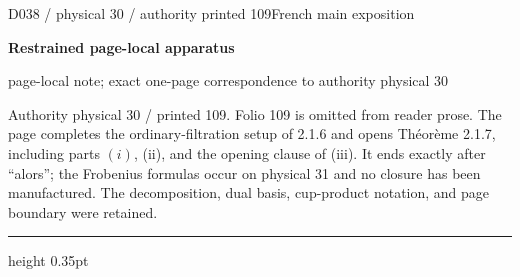 \documentclass[9pt]{article}
\newcommand{\CanonText}[1]{\par{\fontsize{8.0}{9.35}\selectfont\RaggedRight #1\par}\vspace{2.2pt}}
\newcommand{\LayerTitle}{Restrained page-local apparatus}
\begin{document}
\noindent\begin{minipage}[t][\dimexpr\textheight-5pt\relax][t]{\textwidth}
{\sffamily\fontsize{7.3}{8.2}\selectfont\color{Quiet} D038 / physical 30 / authority printed 109\hfill French main exposition}
\par{}\vspace{4.5pt}
{\sffamily\fontsize{10.4}{11.6}\selectfont\bfseries\color{Accent} \LayerTitle}
\par{\sffamily\fontsize{6.7}{7.7}\selectfont\color{Quiet} page-local note; exact one-page correspondence to authority physical 30}
\vspace{5pt}
\CanonText{Authority physical 30 / printed 109. Folio 109 is omitted from reader prose. The page completes the ordinary-filtration setup of 2.1.6 and opens Théorème 2.1.7, including parts \((i)\), (ii), and the opening clause of (iii). It ends exactly after “alors”; the Frobenius formulas occur on physical 31 and no closure has been manufactured. The decomposition, dual basis, cup-product notation, and page boundary were retained.}
\vfill
{\color{Accent}\hrule height 0.35pt}\vspace{3pt}
\end{minipage}
\newpage
\end{document}
